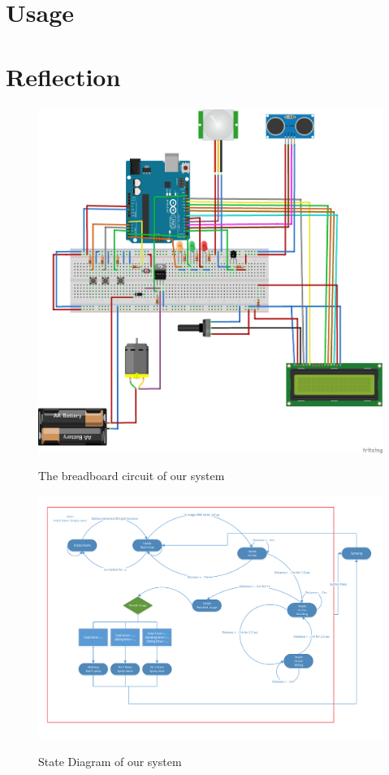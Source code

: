 \documentclass[a4paper, 11pt]{article}
\begin{document}
\section{Usage}

\section{Reflection}


\begin{figure}
\includegraphics[scale=0.5]{schakeling_bb.png}
\label{fig:circuit}
\caption{The breadboard circuit of our system}
\end{figure}  
\newpage
\begin{landscape}
\begin{figure}[h!]
\includegraphics[scale=0.7]{State_Diagram.pdf}
\label{fig:stateDia}
\caption{State Diagram of our system}
\end{figure}
\end{landscape}
\end{document}

